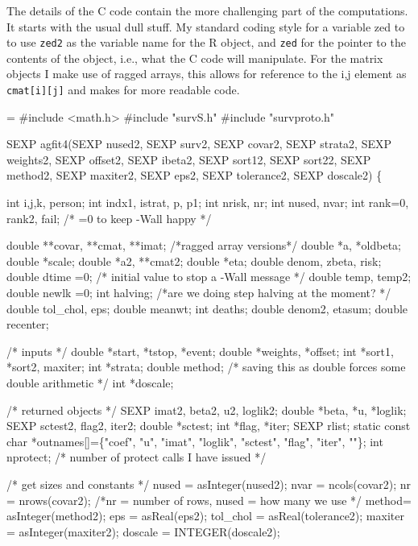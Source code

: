 \documentclass{article}
\newcommand{\code}[1]{\texttt{#1}}
\begin{document}
The details of the C code contain the more challenging part of the
computations.
It starts with the usual dull stuff.
My standard coding style for a variable zed to to use
\Verb!zed2! as the variable name for the R object, and \Verb?zed? for
the pointer to the contents of the object, i.e., what the
C code will manipulate.
For the matrix objects I make use of ragged arrays, this
allows for reference to the i,j element as \code{cmat[i][j]}
and makes for more readable code.

\begin{nwchunk}
=
 #include <math.h>
 #include "survS.h" 
 #include "survproto.h"
 
 SEXP agfit4(SEXP nused2, SEXP surv2,      SEXP covar2,    SEXP strata2,
             SEXP weights2,   SEXP offset2,   SEXP ibeta2,
             SEXP sort12,     SEXP sort22,    SEXP method2,
             SEXP maxiter2,   SEXP  eps2,     SEXP tolerance2,
             SEXP doscale2) \{ 
                 
     int i,j,k, person;
     int indx1, istrat, p, p1;
     int nrisk, nr;
     int nused, nvar;
     int rank=0, rank2, fail;  /* =0 to keep -Wall happy */
    
     double **covar, **cmat, **imat;  /*ragged array versions*/
     double *a, *oldbeta;
     double *scale;
     double *a2, **cmat2;
     double *eta;
     double  denom, zbeta, risk;
     double  dtime =0;  /* initial value to stop a -Wall message */
     double  temp, temp2;
     double  newlk =0;
     int  halving;    /*are we doing step halving at the moment? */
     double  tol_chol, eps;
     double  meanwt;
     int deaths;
     double denom2, etasum;
     double recenter;
 
     /* inputs */
     double *start, *tstop, *event;
     double *weights, *offset;
     int *sort1, *sort2, maxiter;
     int *strata;
     double method;  /* saving this as double forces some double arithmetic */
     int *doscale;
 
     /* returned objects */
     SEXP imat2, beta2, u2, loglik2;
     double *beta, *u, *loglik;
     SEXP sctest2, flag2, iter2;
     double *sctest;
     int *flag, *iter;
     SEXP rlist;
     static const char *outnames[]=\{"coef", "u", "imat", "loglik",
                                    "sctest", "flag", "iter", ""\};
     int nprotect;  /* number of protect calls I have issued */
 
     /* get sizes and constants */
     nused = asInteger(nused2);
     nvar  = ncols(covar2);
     nr    = nrows(covar2);  /*nr = number of rows, nused = how many we use */
     method= asInteger(method2);
     eps   = asReal(eps2);
     tol_chol = asReal(tolerance2);
     maxiter = asInteger(maxiter2);
     doscale = INTEGER(doscale2);
   

\end{nwchunk}
\end{document}
